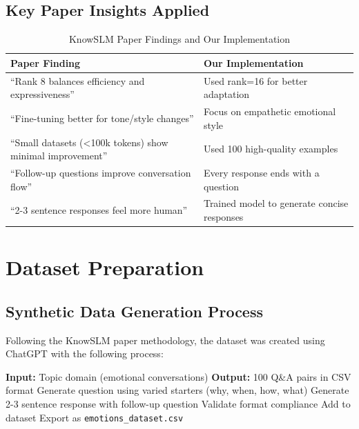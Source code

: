 \documentclass[12pt,a4paper]{article}
\begin{document}
\subsection{Key Paper Insights Applied}

\begin{table}[H]
\centering
\caption{KnowSLM Paper Findings and Our Implementation}
\begin{tabular}{p{6cm}p{6cm}}
\toprule
\textbf{Paper Finding} & \textbf{Our Implementation} \\
\midrule
``Rank 8 balances efficiency and expressiveness'' & Used rank=16 for better adaptation \\
``Fine-tuning better for tone/style changes'' & Focus on empathetic emotional style \\
``Small datasets (<100k tokens) show minimal improvement'' & Used 100 high-quality examples \\
``Follow-up questions improve conversation flow'' & Every response ends with a question \\
``2-3 sentence responses feel more human'' & Trained model to generate concise responses \\
\bottomrule
\end{tabular}
\end{table}

\section{Dataset Preparation}

\subsection{Synthetic Data Generation Process}

Following the KnowSLM paper methodology, the dataset was created using ChatGPT with the following process:

\begin{algorithm}[H]
\caption{Synthetic Dataset Generation (KnowSLM Method)}
\begin{algorithmic}[1]
\State \textbf{Input:} Topic domain (emotional conversations)
\State \textbf{Output:} 100 Q\&A pairs in CSV format
    \State Generate question using varied starters (why, when, how, what)
    \State Generate 2-3 sentence response with follow-up question
    \State Validate format compliance
    \State Add to dataset
\EndFor
\State Export as \texttt{emotions\_dataset.csv}
\end{algorithmic}
\end{algorithm}
\end{document}
